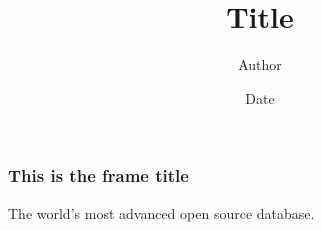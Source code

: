 \documentclass{beamer}
\title{Title}
\author[Author in Footer]{Author}
\institute[Institute in Footer]{Institute}
\date{Date}
\begin{document}
\frame[plain]{\titlepage}

\frame
{
  \frametitle{This is the frame title}

  The world's most advanced open source database.
}
\end{document}

